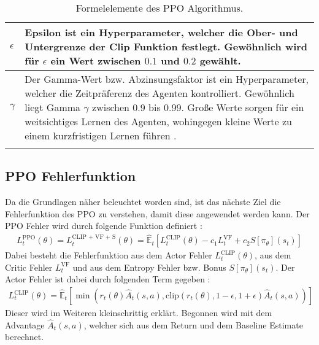 \begin{longtable}[H]{|p{1.5cm}|p{\linewidth - 2.5cm}|}
	\hline
	$\epsilon$ & Epsilon ist ein Hyperparameter, welcher die Ober- und Untergrenze der Clip Funktion festlegt. Gewöhnlich wird für $\epsilon$ ein Wert zwischen $0.1$ und $0.2$ gewählt. \\
	\hline
	$\gamma$ & Der Gamma-Wert bzw. Abzinsungsfaktor ist ein Hyperparameter, welcher die Zeitpräferenz des Agenten kontrolliert. Gewöhnlich liegt Gamma $\gamma$ zwischen 0.9 bis 0.99. Große Werte sorgen für ein weitsichtiges Lernen des Agenten, wohingegen kleine Werte zu einem kurzfristigen Lernen führen \citep[S. 43 bzw. Summary of Notation S. xv]{Sutton1998}. \\
	\hline
	\caption{Formelelemente des PPO Algorithmus.}
	\label{tab:Grundlagen_Formelelemente_PPO} 
\end{longtable}

\subsection{PPO Fehlerfunktion} \label{subsec:Grundlagen_PPO_Fehlerfunktion}
Da die Grundlagen näher beleuchtet worden sind, ist das nächste Ziel die Fehlerfunktion des PPO zu verstehen, damit diese angewendet werden kann. Der PPO Fehler wird durch folgende Funktion definiert \citep[S. 5]{PPO}:
\begin{align}
	\label{eq:PPO_Training_Loss}
	L^\text{PPO}_{t} (\theta) = L^\text{CLIP + VF + S}_{t} (\theta) = \mathbb{\hat{E}}_{t} [L^{\text{CLIP}}_{t}(\theta) - c_{1}L^{\text{VF}}_{t} + c_{2}S[\pi_{\theta}](s_{t})]
\end{align}
Dabei besteht die Fehlerfunktion aus dem Actor Fehler $L^{\text{CLIP}}_{t}(\theta)$, aus dem Critic Fehler $L^{\text{VF}}_{t}$ und aus dem Entropy Fehler bzw. Bonus $S[\pi_{\theta}](s_{t})$. Der Actor Fehler ist dabei durch folgenden Term gegeben \citep[S. 3]{PPO}:
\begin{align}
	\label{eq:Grundlagen_Actor_Loss}
	L^\text{CLIP}_{t} (\theta) = \mathbb{\hat{E}}_{t} [ \min(r_{t}(\theta) \hat{A}_{t}(s, a), \text{clip}(r_{t}(\theta), 1 - \epsilon, 1 + \epsilon) \hat{A}_{t}(s, a))]
\end{align}
Dieser wird im Weiteren kleinschrittig erklärt. Begonnen wird mit dem Advantage $\hat{A}_{t}(s, a)$, welcher sich aus dem Return und dem Baseline Estimate berechnet.

